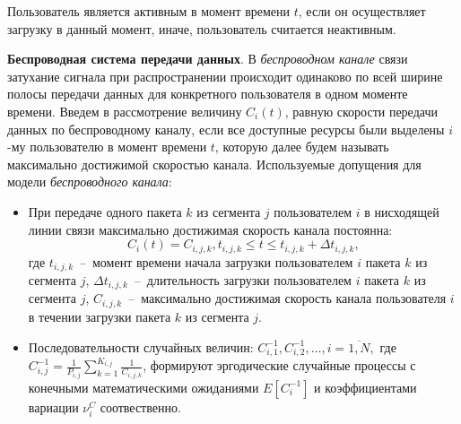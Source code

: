 Пользователь является активным в момент времени $t$, если он осуществляет загрузку в данный момент, иначе, пользователь считается неактивным.

\textbf{Беспроводная система передачи данных}. В \textit{беспроводном канале} связи затухание сигнала при распространении происходит одинаково по всей ширине полосы передачи данных для конкретного пользователя в одном моменте времени. Введем в рассмотрение величину $C_i(t)$, равную скорости передачи данных по беспроводному каналу, если все доступные ресурсы были выделены $i$-му пользователю в момент времени $t$, которую далее будем называть максимально достижимой скоростью канала.
\newline
Используемые допущения для модели \textit{беспроводного канала}:
\begin{itemize}
	\item При передаче одного пакета $k$ из сегмента $j$ пользователем $i$ в нисходящей линии связи максимально достижимая скорость канала постоянна: $$C_i(t)=C_{i,j,k}, t_{i,j,k} \leq t \leq t_{i,j,k}+\Delta t_{i,j,k},$$
	где $t_{i,j,k}$~--~момент времени начала загрузки пользователем $i$ пакета $k$ из сегмента $j$, $\Delta t_{i,j,k}$~--~длительность загрузки пользователем $i$ пакета $k$ из сегмента $j$, $C_{i,j,k}$~--~максимально достижимая скорость канала пользователя $i$ в течении загрузки пакета $k$ из сегмента $j$.
	\item Последовательности случайных величин: $C^{-1}_{i,1}, C^{-1}_{i,2}, \ldots, i=\overline{1,N},$
	где $C_{i,j}^{-1} = \frac{1}{P_{i,j}}\sum\nolimits_{k=1}^{K_{i,j}} \frac{1}{C_{i,j,k}}$, формируют эргодические случайные процессы с конечными математическими ожиданиями $E[C_i^{-1}]$ и коэффициентами вариации $\nu^{C}_i$ соотвественно.
\end{itemize}

